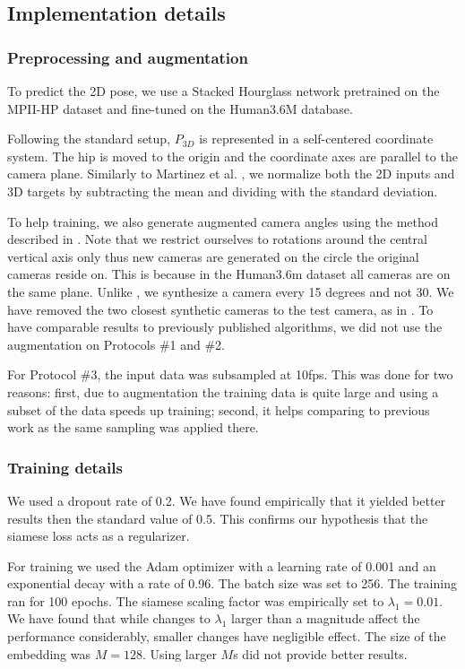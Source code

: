 \documentclass[preprint]{elsarticle}
\begin{document}
\subsection{Implementation details}

\subsubsection{Preprocessing and augmentation} 
To predict the 2D pose, we use a Stacked Hourglass network \cite{stacked_hourglass} pretrained on the MPII-HP dataset \cite{mpii-hp} and fine-tuned on the Human3.6M \cite{h36m} database.

Following the standard setup, $P_{3D}$ is represented in a self-centered coordinate system. The hip is moved to the origin and the coordinate axes are parallel to the camera plane. Similarly to Martinez et al. \cite{3dbaseline}, we normalize both the 2D inputs and 3D targets by subtracting the mean and dividing with the standard deviation. 

To help training, we also generate augmented camera angles using the me\-thod described in \cite{fang2018posegrammar}. Note that we restrict ourselves to rotations around the central vertical axis only thus new cameras are generated on the circle the original cameras reside on. This is because in the Human3.6m dataset all cameras are on the same plane. Unlike \cite{fang2018posegrammar}, we synthesize a camera every 15 degrees and not 30. We have removed the two closest synthetic cameras to the test camera, as in \cite{fang2018posegrammar}. To have comparable results to previously published algorithms, we did not use the augmentation on Protocols \#1 and \#2. 

For Protocol \#3, the input data was subsampled at 10fps. This was done for two reasons: first, due to augmentation the training data is quite large and using a subset of the data speeds up training; second, it helps comparing to previous work as the same sampling was applied there.

\subsubsection{Training details} 
We used a dropout rate of 0.2. We have found empirically that it yielded better results then the standard value of 0.5. This confirms our hypothesis that the siamese loss acts as a regularizer.

For training we used the Adam optimizer with a learning rate of 0.001 and an exponential decay with a rate of 0.96. The batch size was set to 256. The training ran for 100 epochs. The siamese scaling factor was empirically set to $\lambda_1=0.01$. We have found that while changes to $\lambda_1$ larger than a magnitude affect the performance considerably, smaller changes have negligible effect.  The size of the embedding was $M=128$. Using larger $M$s did not provide better results.
\end{document}
